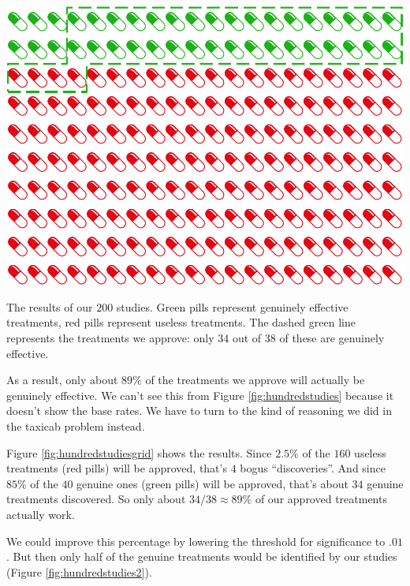 \documentclass[justified]{tufte-book}
\theoremstyle{definition}
\theoremstyle{definition}
\theoremstyle{definition}
\theoremstyle{remark}
\begin{document}
\begin{marginfigure}
\includegraphics{_main_files/figure-latex/hundredstudiesgrid-1} \caption[The results of our $200$ studies]{The results of our $200$ studies. Green pills represent genuinely effective treatments, red pills represent useless treatments. The dashed green line represents the treatments we approve: only $34$ out of $38$ of these are genuinely effective.}\label{fig:hundredstudiesgrid}
\end{marginfigure}

As a result, only about \(89\%\) of the treatments we approve will
actually be genuinely effective. We can't see this from Figure
\ref{fig:hundredstudies} because it doesn't show the base rates. We have
to turn to the kind of reasoning we did in the taxicab problem instead.

Figure \ref{fig:hundredstudiesgrid} shows the results. Since \(2.5\%\)
of the \(160\) useless treatments (red pills) will be approved, that's
\(4\) bogus ``discoveries''. And since \(85\%\) of the \(40\) genuine
ones (green pills) will be approved, that's about \(34\) genuine
treatments discovered. So only about \(34/38 \approx 89\%\) of our
approved treatments actually work.

We could improve this percentage by lowering the threshold for
significance to \(.01\). But then only half of the genuine treatments
would be identified by our studies (Figure \ref{fig:hundredstudies2}).
\end{document}
